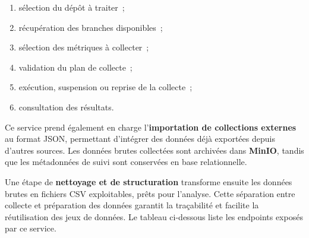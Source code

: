 \begin{enumerate}
    \item sélection du dépôt à traiter~;
    \item récupération des branches disponibles~;
    \item sélection des métriques à collecter~;
    \item validation du plan de collecte~;
    \item exécution, suspension ou reprise de la collecte~;
    \item consultation des résultats.
\end{enumerate}

Ce service prend également en charge l'\textbf{importation de collections externes} au format
JSON, permettant d'intégrer des données déjà exportées depuis d'autres sources. Les données brutes
collectées sont archivées dans \textbf{MinIO}, tandis que les métadonnées de suivi sont conservées
en base relationnelle.

Une étape de \textbf{nettoyage et de structuration} transforme ensuite les données brutes en
fichiers CSV exploitables, prêts pour l'analyse. Cette séparation entre collecte et préparation
des données garantit la traçabilité et facilite la réutilisation des jeux de données. Le tableau
ci-dessous liste les endpoints exposés par ce service.

